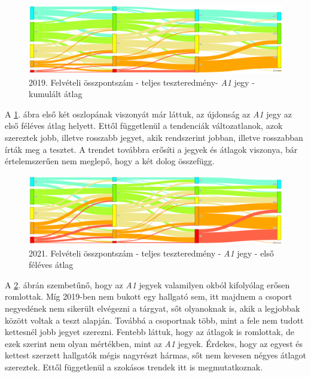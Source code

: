 \documentclass[12pt]{article}
\begin{document}
\begin{figure}[H]
\centering
\includegraphics[scale=0.5]{kepek/2019_felvi_teszt_a1_kumatl.png}
\caption{2019. Felvételi összpontszám - teljes teszteredmény- \textit{A1} jegy - kumulált átlag}
\label{fig:2019_felvi_teszt_a1_kumatl}
\end{figure}

A \ref{fig:2019_felvi_teszt_a1_kumatl}. ábra első két oszlopának viszonyát már láttuk, az újdonság az \textit{A1} jegy az első féléves átlag helyett. Ettől függetlenül a tendenciák változatlanok, azok szereztek jobb, illetve rosszabb jegyet, akik rendszerint jobban, illetve rosszabban írták meg a tesztet. A trendet továbbra erősíti a jegyek és átlagok viszonya, bár értelemszerűen nem meglepő, hogy a két dolog összefügg.

\begin{figure}[H]
\centering
\includegraphics[scale=0.5]{kepek/2021_felvi_teszt_a1_atlag.png}
\caption{2021. Felvételi összpontszám - teljes teszteredmény - \textit{A1} jegy - első féléves átlag}
\label{fig:2021_felvi_teszt_a1_atlag}
\end{figure}

A \ref{fig:2021_felvi_teszt_a1_atlag}. ábrán szembetűnő, hogy az \textit{A1} jegyek valamilyen okból kifolyólag erősen romlottak. Míg 2019-ben nem bukott egy hallgató sem, itt majdnem a csoport negyedének nem sikerült elvégezni a tárgyat, sőt olyanoknak is, akik a legjobbak között voltak a teszt alapján. Továbbá a csoportnak több, mint a fele nem tudott kettesnél jobb jegyet szerezni. Fentebb láttuk, hogy az átlagok is romlottak, de ezek szerint nem olyan mértékben, mint az \textit{A1} jegyek. Érdekes, hogy az egyest és kettest szerzett hallgatók mégis nagyrészt hármas, sőt nem kevesen négyes átlagot szereztek. Ettől függetlenül a szokásos trendek itt is megmutatkoznak.
 
\end{document}
